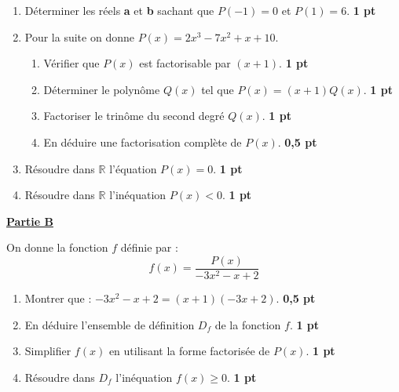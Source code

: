 \documentclass[12pt,a4paper]{article}
\begin{document}
\begin{enumerate}
    \item Déterminer les réels \textbf{a} et \textbf{b} sachant que $P(-1) = 0$ et $P(1) = 6$. \hfill \textbf{1 pt}
    \item Pour la suite on donne $P(x) = 2x^3 - 7x^2 + x + 10$.
    \begin{enumerate}
        \item Vérifier que $P(x)$ est factorisable par $(x + 1)$. \hfill \textbf{1 pt}
        \item Déterminer le polynôme $Q(x)$ tel que $P(x) = (x + 1)Q(x)$. \hfill \textbf{1 pt}
        \item Factoriser le trinôme du second degré $Q(x)$. \hfill \textbf{1 pt}
        \item En déduire une factorisation complète de $P(x)$. \hfill \textbf{0,5 pt}
    \end{enumerate}
    \item Résoudre dans $\mathbb{R}$ l'équation $P(x) = 0$. \hfill \textbf{1 pt}
    \item Résoudre dans $\mathbb{R}$ l'inéquation $P(x) < 0$. \hfill \textbf{1 pt}
\end{enumerate}

\vspace{0.4cm}

\noindent\textbf{\underline{Partie B}}

\vspace{0.2cm}

\noindent On donne la fonction $f$ définie par :
\[ f(x) = \frac{P(x)}{-3x^2 - x + 2} \]

\begin{enumerate}
    \item Montrer que : $-3x^2 - x + 2 = (x + 1)(-3x + 2)$. \hfill \textbf{0,5 pt}
    \item En déduire l'ensemble de définition $D_f$ de la fonction $f$. \hfill \textbf{1 pt}
    \item Simplifier $f(x)$ en utilisant la forme factorisée de $P(x)$. \hfill \textbf{1 pt}
    \item Résoudre dans $D_f$ l'inéquation $f(x) \geq 0$. \hfill \textbf{1 pt}
\end{enumerate}
\end{document}
